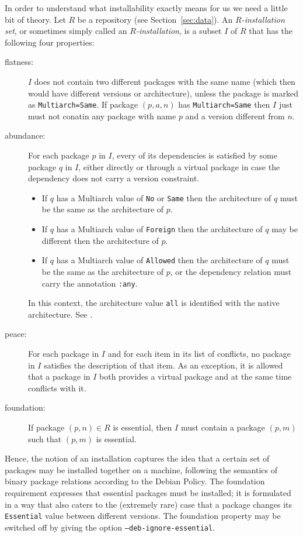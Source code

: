 In order to understand what installability exactly means for us we
need a little bit of theory.  Let $R$ be a repository (see
Section~\ref{sec:data}).  An \emph{$R$-installation set}, or sometimes
simply called an \emph{$R$-installation}, is a subset $I$ of $R$ that
has the following four properties:
\begin{description}
  \item[flatness:] $I$ does not contain two different packages with
    the same name (which then would have different versions or
    architecture), unless the package is marked as
    \texttt{Multiarch=Same}. If package $(p,a,n)$ has
    \texttt{Multiarch=Same} then $I$ just must not conatin any package
    with name $p$ and a version different from $n$.
  \item[abundance:] For each package $p$ in $I$, every of its
    dependencies is satisfied by some package $q$ in $I$, either
    directly or through a virtual package in case the dependency does
    not carry a version constraint. 
    \begin{itemize}
    \item If $q$ has a Multiarch value of \texttt{No} or \texttt{Same}
      then the architecture of $q$ must be the same as the
      architecture of $p$.
    \item If $q$ has a Multiarch value of \texttt{Foreign} then the
      architecture of $q$ may be different then the architecture of $p$.
    \item If $q$ has a Multiarch value of \texttt{Allowed} then the
      architecture of $q$ must be the same as the architecture of $p$,
      or the dependency relation must carry the annotation \texttt{:any}.
    \end{itemize}
    In this context, the architecture value \texttt{all} is identified with
    the native architecture. See \cite{ubuntu:multiarch}.
  \item[peace:] For each package in $I$ and for each item in its list
    of conflicts, no package in $I$ satisfies the description of that
    item.  As an exception, it is allowed that a package in $I$ both
    provides a virtual package and at the same time conflicts with it.
  \item[foundation:] If package $(p,n)\in R$ is essential, then $I$
    must contain a package $(p,m)$ such that $(p,m)$ is essential.
\end{description}
Hence, the notion of an installation captures the idea that a certain
set of packages may be installed together on a machine, following the
semantics of binary package relations according to the Debian Policy.
The foundation requirement expresses that essential packages must be
installed; it is formulated in a way that also caters to the
(extremely rare) case that a package changes its \texttt{Essential}
value between different versions. The foundation property may be
switched off by giving the option \texttt{--deb-ignore-essential}.

